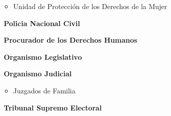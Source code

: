 \begin{itemize}
\begin{itemize}
			\item	 Unidad de Protección de los Derechos de la Mujer	
		\end{itemize}		
		\item[$ $] \textbf{Policia Nacional Civil}
		\item[$ $] \textbf{Procurador de los Derechos Humanos}
		\item[$ $] \textbf{Organismo Legislativo}		
		\item[$ $] \textbf{Organismo Judicial}					
		\begin{itemize}
			\item	 Juzgados de Familia	
		\end{itemize}
		\item[$ $] \textbf{Tribunal Supremo Electoral}					
	\end{itemize}
	
